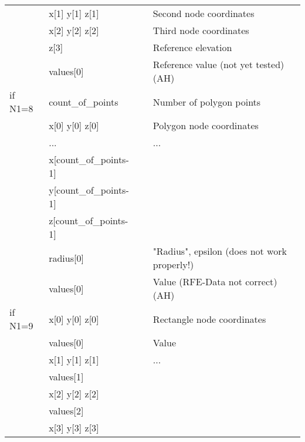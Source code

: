 \begin{tabular}{|p{1.5cm}|p{2.75cm}|c|p{8.5cm}|}
            & {\footnotesize x[1] y[1] z[1]}           & & Second node coordinates          \\
            & {\footnotesize x[2] y[2] z[2]}           & & Third node coordinates           \\
            & {\footnotesize z[3]}                     & & Reference elevation              \\
            & {\footnotesize values[0]}                & & Reference value \hfill  (not yet tested)  (AH) \\
%
  \hline
%
%
  if N1=8   & {\footnotesize count\_of\_points}          & & Number of polygon points         \\
            & {\footnotesize x[0] y[0] z[0]}           & & Polygon node coordinates         \\
            & {\footnotesize ...}                      & & ...                              \\
            & {\footnotesize x[count\_of\_points-1]}     & &                                  \\
            & {\footnotesize y[count\_of\_points-1]}     & &                                  \\
            & {\footnotesize z[count\_of\_points-1]}     & &                                  \\
            & {\footnotesize radius[0]}                & & "Radius", epsilon  \hfill (does not work properly!)              \\
            & {\footnotesize values[0]}                & & Value \hfill  (RFE-Data not correct) (AH)\\
%
  \hline
%
  if N1=9   & {\footnotesize x[0] y[0] z[0]} &      & Rectangle node coordinates  \\
            & {\footnotesize values[0]}      &      & Value                                 \\
            & {\footnotesize x[1] y[1] z[1]} &      & ...                                   \\
            & {\footnotesize values[1]}      &      &                                       \\
            & {\footnotesize x[2] y[2] z[2]} &      &                                       \\
            & {\footnotesize values[2]}      &      &                                       \\
            & {\footnotesize x[3] y[3] z[3]} &      &                                       \\

\end{tabular}
